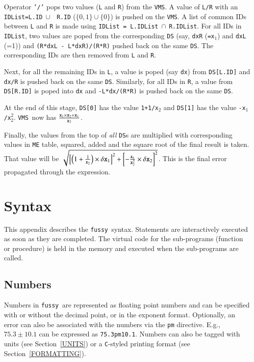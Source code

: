 \documentclass[12pt]{article}
\newcommand{\Fussy}{{\tt fussy}}
\newcommand{\VMS}{{\tt VMS}}
\begin{document}
\begin{enumerate}
  Operator {\tt '/'} pops two values ({\tt L} and {\tt R}) from the
  \VMS.  A value of {\tt L/R} with an {\tt IDList=L.ID}$~\cup~${\tt
  R.ID} ($\{0,1\}\cup\{0\}$) is pushed on the \VMS.  A list of common
  IDs between {\tt L} and {\tt R} is made using {\tt IDList =
  L.IDList}$~\cap~${\tt R.IDList}.  For all IDs in {\tt IDList}, two
  values are poped from the corresponding {\tt DS} (say, {\tt dxR}
  ({\tt =x$_1$}) and {\tt dxL} (=1)) and {\tt (R*dxL -
  L*dxR)/(R*R)} pushed back on the same {\tt DS}.  The corresponding
  IDs are then removed from {\tt L} and {\tt R}.
  
  Next, for all the remaining IDs in {\tt L}, a value is poped (say
  {\tt dx}) from {\tt DS[L.ID]} and {\tt dx/R} is pushed back on the
  same {\tt DS}.  Similarly, for all IDs in {\tt R}, a value from {\tt
  DS[R.ID]} is poped into {\tt dx} and {\tt -L*dx/(R*R)} is pushed
  back on the same {\tt DS}.
  
  At the end of this stage, {\tt DS[0]} has the value {\tt 1+1/x$_2$}
  and {\tt DS[1]} has the value {\tt -x$_1$/x$_2^2$}.  \VMS\ now has
  ${{\tt x}_1 \times {\tt x}_2 + {\tt x}_1 \over {\tt x}_2}$.
       
\end{enumerate}

Finally, the values from the top of {\it all} {\tt DS}s are multiplied
with corresponding values in {\tt ME} table, squared, added and the
square root of the final result is taken.  That value will be
$\sqrt{\left[\left(1+{1\over {\tt x}_2}\right) \times \delta {\tt
x}_1\right]^2+\left[-{{\tt x}_1 \over {\tt x}_2^2} \times \delta {\tt
x}_2\right]^2}$.  This is the final error propagated through the
expression.

\section{Syntax}
\label{APPEN:SYNTAX}

This appendix describes the \Fussy\ syntax.  Statements are
interactively executed as soon as they are completed.  The virtual
code for the sub-programs (function or procedure) is held in the
memory and executed when the sub-programs are called.

\subsection{Numbers}
\label{NUMBERS}
Numbers in \Fussy\ are represented as floating point numbers and can
be specified with or without the decimal point, or in the exponent
format.  Optionally, an error can also be associated with the numbers
via the {\tt pm} directive.  E.g., $75.3\pm 10.1$ can be expressed as
{\tt 75.3pm10.1}.  Numbers can also be tagged with units (see
Section~\ref{UNITS}) or a {\tt C}-styled printing format (see
Section~\ref{FORMATTING}).
\end{document}
